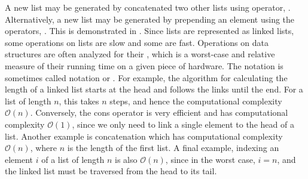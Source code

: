 \documentclass[fsharpNotes.tex]{subfiles}
\begin{document}

A new list may be generated by concatenated two other lists using  operator, . Alternatively, a new list may be generated by prepending an element using the  operators,  \idx[::@\lstinline{::}]{\lexeme{::}}. This is demonstrated in .
%
%
Since lists are represented as linked lists, some operations on lists are slow and some are fast. Operations on data structures are often analyzed for their , which is a worst-case and relative measure of their running time on a given piece of hardware. The notation is sometimes called  notation or . For example, the algorithm for calculating the length of a linked list starts at the head and follows the links until the end. For a list of length $n$, this takes $n$ steps, and hence the computational complexity $\mathcal{O}(n)$. Conversely, the cons operator is very efficient and has computational complexity $\mathcal{O}(1)$, since we only need to link a single element to the head of a list. Another example is concatenation which has computational complexity $\mathcal{O}(n)$, where $n$ is the length of the first list. A final example, indexing an element $i$ of a list of length $n$ is also $\mathcal{O}(n)$, since in the worst case, $i=n$, and the linked list must be traversed from the head to its tail.
\end{document}
